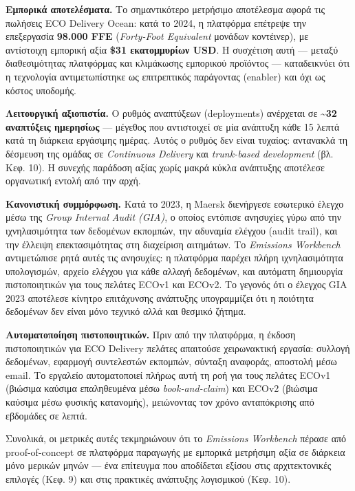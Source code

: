 \textbf{Εμπορικά αποτελέσματα.} Το σημαντικότερο μετρήσιμο αποτέλεσμα
αφορά τις πωλήσεις ECO Delivery Ocean: κατά το 2024, η πλατφόρμα
επέτρεψε την επεξεργασία \textbf{98.000 FFE} (\emph{Forty-Foot
Equivalent} μονάδων κοντέινερ), με αντίστοιχη εμπορική αξία \textbf{\$31
εκατομμυρίων USD}. Η συσχέτιση αυτή --- μεταξύ διαθεσιμότητας πλατφόρμας
και κλιμάκωσης εμπορικού προϊόντος --- καταδεικνύει ότι η τεχνολογία
αντιμετωπίστηκε ως επιτρεπτικός παράγοντας (enabler) και όχι ως κόστος
υποδομής.

\textbf{Λειτουργική αξιοπιστία.} Ο ρυθμός αναπτύξεων (deployments)
ανέρχεται σε \textbf{\textasciitilde32 αναπτύξεις ημερησίως} --- μέγεθος
που αντιστοιχεί σε μία ανάπτυξη κάθε 15 λεπτά κατά τη διάρκεια εργάσιμης
ημέρας. Αυτός ο ρυθμός δεν είναι τυχαίος: αντανακλά τη δέσμευση της
ομάδας σε \emph{Continuous Delivery} και \emph{trunk-based development}
(βλ. Κεφ. 10). Η συνεχής παράδοση αξίας χωρίς μακρά κύκλα ανάπτυξης
αποτέλεσε οργανωτική εντολή από την αρχή.

\textbf{Κανονιστική συμμόρφωση.} Κατά το 2023, η Maersk διενήργεσε
εσωτερικό έλεγχο μέσω της \emph{Group Internal Audit (GIA)}, ο οποίος
εντόπισε ανησυχίες γύρω από την ιχνηλασιμότητα των δεδομένων εκπομπών,
την αδυναμία ελέγχου (audit trail), και την έλλειψη επεκτασιμότητας στη
διαχείριση αιτημάτων. Το \emph{Emissions Workbench} αντιμετώπισε ρητά
αυτές τις ανησυχίες: η πλατφόρμα παρέχει πλήρη ιχνηλασιμότητα
υπολογισμών, αρχείο ελέγχου για κάθε αλλαγή δεδομένων, και αυτόματη
δημιουργία πιστοποιητικών για τους πελάτες ECOv1 και ECOv2. Το γεγονός
ότι ο έλεγχος GIA 2023 αποτέλεσε κίνητρο επιτάχυνσης ανάπτυξης
υπογραμμίζει ότι η ποιότητα δεδομένων δεν είναι μόνο τεχνικό αλλά και
θεσμικό ζήτημα.

\textbf{Αυτοματοποίηση πιστοποιητικών.} Πριν από την πλατφόρμα, η έκδοση
πιστοποιητικών για ECO Delivery πελάτες απαιτούσε χειρωνακτική εργασία:
συλλογή δεδομένων, εφαρμογή συντελεστών εκπομπών, σύνταξη αναφοράς,
αποστολή μέσω email. Το εργαλείο αυτοματοποιεί πλήρως αυτή τη ροή για
τους πελάτες ECOv1 (βιώσιμα καύσιμα επαληθευμένα μέσω
\emph{book-and-claim}) και ECOv2 (βιώσιμα καύσιμα μέσω φυσικής
κατανομής), μειώνοντας τον χρόνο ανταπόκρισης από εβδομάδες σε λεπτά.

Συνολικά, οι μετρικές αυτές τεκμηριώνουν ότι το \emph{Emissions
Workbench} πέρασε από proof-of-concept σε πλατφόρμα παραγωγής με
εμπορικά μετρήσιμη αξία σε διάρκεια μόνο μερικών μηνών --- ένα επίτευγμα
που αποδίδεται εξίσου στις αρχιτεκτονικές επιλογές (Κεφ. 9) και στις
πρακτικές ανάπτυξης λογισμικού (Κεφ. 10).

